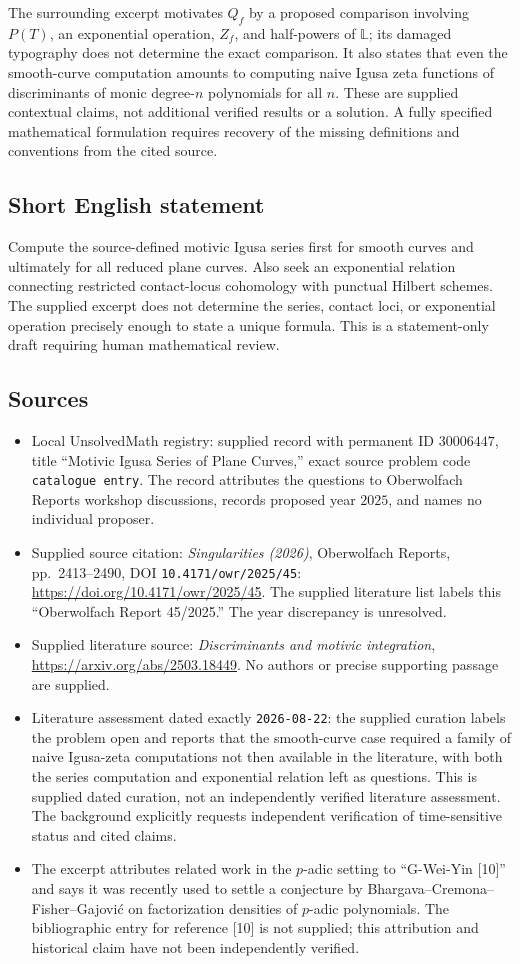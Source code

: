 \documentclass[11pt]{article}
\begin{document}
The surrounding excerpt motivates \(Q_f\) by a proposed comparison involving \(P(T)\), an exponential operation, \(Z_f\), and half-powers of \(\mathbb L\); its damaged typography does not determine the exact comparison. It also states that even the smooth-curve computation amounts to computing naive Igusa zeta functions of discriminants of monic degree-\(n\) polynomials for all \(n\). These are supplied contextual claims, not additional verified results or a solution. A fully specified mathematical formulation requires recovery of the missing definitions and conventions from the cited source.
\subsection{Short English statement}
Compute the source-defined motivic Igusa series first for smooth curves and ultimately for all reduced plane curves. Also seek an exponential relation connecting restricted contact-locus cohomology with punctual Hilbert schemes. The supplied excerpt does not determine the series, contact loci, or exponential operation precisely enough to state a unique formula. This is a statement-only draft requiring human mathematical review.
\subsection{Sources}
\begin{itemize}
\item Local UnsolvedMath registry: supplied record with permanent ID \(30006447\), title ``Motivic Igusa Series of Plane Curves,'' exact source problem code \texttt{catalogue entry}. The record attributes the questions to Oberwolfach Reports workshop discussions, records proposed year \(2025\), and names no individual proposer.
\item Supplied source citation: \emph{Singularities (2026)}, Oberwolfach Reports, pp.~2413--2490, DOI \texttt{10.4171/owr/2025/45}: \url{https://doi.org/10.4171/owr/2025/45}. The supplied literature list labels this ``Oberwolfach Report 45/2025.'' The year discrepancy is unresolved.
\item Supplied literature source: \emph{Discriminants and motivic integration}, \url{https://arxiv.org/abs/2503.18449}. No authors or precise supporting passage are supplied.
\item Literature assessment dated exactly \texttt{2026-08-22}: the supplied curation labels the problem open and reports that the smooth-curve case required a family of naive Igusa-zeta computations not then available in the literature, with both the series computation and exponential relation left as questions. This is supplied dated curation, not an independently verified literature assessment. The background explicitly requests independent verification of time-sensitive status and cited claims.
\item The excerpt attributes related work in the \(p\)-adic setting to ``G-Wei-Yin [10]'' and says it was recently used to settle a conjecture by Bhargava--Cremona--Fisher--Gajovi\'{c} on factorization densities of \(p\)-adic polynomials. The bibliographic entry for reference [10] is not supplied; this attribution and historical claim have not been independently verified.
\end{itemize}
\end{document}
